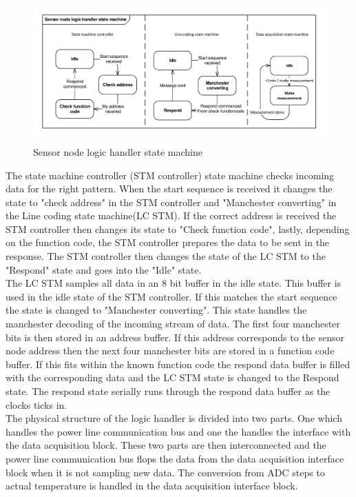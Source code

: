 \begin{figure}[H]
	\centering
	\includegraphics[width=1\textwidth]{billeder/logic_handler_stm}
	\caption{Sensor node logic handler state machine}
\end{figure}

The state machine controller (STM controller) state machine checks incoming data for the right pattern. When the start sequence is received it changes the state to "check address" in the STM controller and "Manchester converting" in the Line coding state machine(LC STM). If the correct address is received the STM controller then changes its state to "Check function code", lastly, depending on the function code, the STM controller prepares the data to be sent in the response. The STM controller then changes the state of the LC STM to the "Respond" state and goes into the "Idle" state.\\
The LC STM samples all data in an 8 bit buffer in the idle state. This buffer is used in the idle state of the STM controller. If this matches the start sequence the state is changed to "Manchester converting". This state handles the manchester decoding of the incoming stream of data. The first four manchester bits is then stored in an address buffer. If this address corresponds to the sensor node address then the next four manchester bits are stored in a function code buffer. If this fits within the known function code the respond data buffer is filled with the corresponding data and the LC STM state is changed to the Respond state. The respond state serially runs through the respond data buffer as the clocks ticks in.\\

The physical structure of the logic handler is divided into two parts. One which handles the power line communication bus and one the handles the interface with the data acquisition block. These two parts are then interconnected and the power line communication bus flops the data from the data acquisition interface block when it is not sampling new data. The conversion from ADC steps to actual temperature is handled in the data acquisition interface block.

